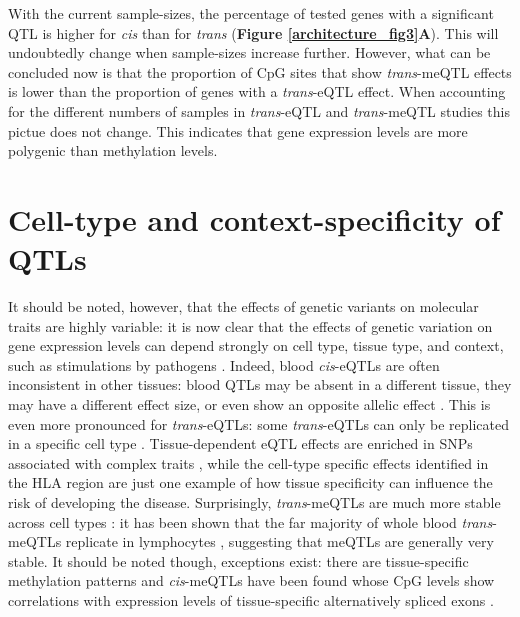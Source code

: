With the current sample-sizes, the percentage of tested genes with a significant QTL is higher for \textit{cis} than for \textit{trans} (\textbf{Figure \ref{architecture_fig3}A}). This will undoubtedly change when sample-sizes increase further. However, what can be concluded now is that the proportion of CpG sites that show \textit{trans}-meQTL effects is lower than the proportion of genes with a \textit{trans}-eQTL effect. When accounting for the different numbers of samples in \textit{trans}-eQTL and \textit{trans}-meQTL studies this pictue does not change. This indicates that gene expression levels are more polygenic than methylation levels. 

\section{Cell-type and context-specificity of QTLs}
It should be noted, however, that the effects of genetic variants on molecular traits are highly variable: it is now clear that the effects of genetic variation on gene expression levels can depend strongly on cell type, tissue type, and context, such as stimulations by pathogens \cite{fuUnravelingRegulatoryMechanisms2012,gat-viksDecipheringMolecularCircuits2013,fairfaxInnateImmuneActivity2014,leeCommonGeneticVariants2014,meleHumanTranscriptomeTissues2015}. Indeed, blood \textit{cis}-eQTLs are often inconsistent in other tissues: blood QTLs may be absent in a different tissue, they may have a different effect size, or even show an opposite allelic effect \cite{fuUnravelingRegulatoryMechanisms2012}. This is even more pronounced for \textit{trans}-eQTLs: some \textit{trans}-eQTLs can only be replicated in a specific cell type \cite{westraSystematicIdentificationTrans2013}. Tissue-dependent eQTL effects are enriched in SNPs associated with complex traits \cite{fuUnravelingRegulatoryMechanisms2012}, while the cell-type specific effects identified in the HLA region \cite{fairfaxGeneticsGeneExpression2012} are just one example of how tissue specificity can influence the risk of developing the disease. Surprisingly, \textit{trans}-meQTLs are much more stable across cell types \cite{gutierrez-arcelusTissueSpecificEffectsGenetic2015}: it has been shown that the far majority of whole blood \textit{trans}-meQTLs replicate in lymphocytes \cite{bonderDiseaseVariantsAlter2017}, suggesting that meQTLs are generally very stable. It should be noted though, exceptions exist: there are tissue-specific methylation patterns \cite{lokkDNAMethylomeProfiling2014} and \textit{cis}-meQTLs have been found whose CpG levels show correlations with expression levels of tissue-specific alternatively spliced exons \cite{gutierrez-arcelusTissueSpecificEffectsGenetic2015}.

